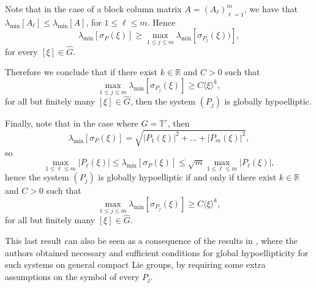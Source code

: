 \documentclass[11pt]{amsart}
\numberwithin{theorem}{section}
\numberwithin{equation}{section}
\theoremstyle{definition}
\numberwithin{example}{section}
\theoremstyle{definition}
\theoremstyle{definition}
\newcommand{\R}{\mathbb{R}}
\newcommand{\T}{\mathbb{T}}
\begin{document}
    
    Note that in the case of a block column matrix $A=(A_\ell)_{\ell=1}^m$, we have that $\lambda_{\min}[A_\ell]\leq \lambda_{\min}[A]$, for $1\leq \ell\leq m$. Hence
\begin{equation*}
    \lambda_{\min}[\sigma_P(\xi)]\geq \max_{1\leq j\leq m}\lambda_{\min}[\sigma_{P_j}(\xi))],
\end{equation*}
for every $[\xi]\in\widehat{G}$.

Therefore we conclude that if there exist $k\in\R$ and $C>0$ such that
\begin{equation*}
    \max_{1\leq j\leq m}\lambda_{\min}[\sigma_{P_{j}}(\xi)]\geq C\langle\xi\rangle^k,
\end{equation*}
for all but finitely many $[\xi]\in\widehat{G}$, then the system $(P_j)$ is globally hypoelliptic.

Finally, note that in the case where $G=\T^r$, then 
\begin{equation*}
    \lambda_{\min}[\sigma_P(\xi)]=\sqrt{|P_{1}(\xi)|^2+\dots+|P_{m}(\xi)|^2},
\end{equation*}
so 
\begin{equation*}
    \max_{1\leq \ell\leq m}|P_{\ell}(\xi)|\leq \lambda_{\min}[\sigma_P(\xi)]\leq \sqrt{m}\max_{1\leq \ell\leq m}|P_{\ell}(\xi)|,
\end{equation*}
hence the system $(P_j)$ is globally hypoelliptic if and only if there exist $k\in\R$ and $C>0$ such that
\begin{equation*}
    \max_{1\leq j\leq m}\lambda_{\min}[\sigma_{P_{j}}(\xi)]\geq C\langle\xi\rangle^k,
\end{equation*}
for all but finitely many $[\xi]\in\widehat{G}$.

 This last result can also be seen as a consequence of the results in \cite{diag-systems}, where the authors obtained necessary and sufficient conditions for global hypoellipticity for such systems on general compact Lie groups, by requiring some extra assumptions on the symbol of every $P_j$.
\end{document}
